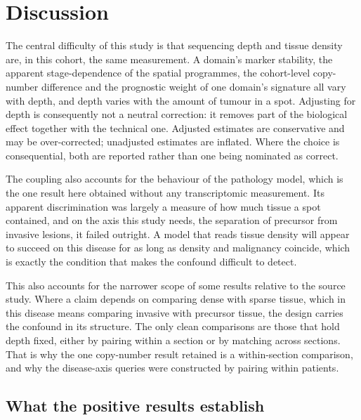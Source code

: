 \section{Discussion}

The central difficulty of this study is that sequencing depth and tissue density are, in
this cohort, the same measurement. A domain's marker stability, the apparent
stage-dependence of the spatial programmes, the cohort-level copy-number difference and the
prognostic weight of one domain's signature all vary with depth, and depth varies with the
amount of tumour in a spot. Adjusting for depth is consequently not a neutral correction: it
removes part of the biological effect together with the technical one. Adjusted estimates
are conservative and may be over-corrected; unadjusted estimates are inflated. Where the
choice is consequential, both are reported rather than one being nominated as correct.

The coupling also accounts for the behaviour of the pathology model, which is the one
result here obtained without any transcriptomic measurement. Its apparent discrimination
was largely a measure of how much tissue a spot contained, and on the axis this study needs,
the separation of precursor from invasive lesions, it failed outright. A model that reads
tissue density will appear to succeed on this disease for as long as density and malignancy
coincide, which is exactly the condition that makes the confound difficult to detect.

This also accounts for the narrower scope of some results relative to the source study.
Where a claim depends on comparing dense with sparse tissue, which in this disease means
comparing invasive with precursor tissue, the design carries the confound in its structure.
The only clean comparisons are those that hold depth fixed, either by pairing within a
section or by matching across sections. That is why the one copy-number result retained is a
within-section comparison, and why the disease-axis queries were constructed by pairing
within patients.

\subsection{What the positive results establish}

